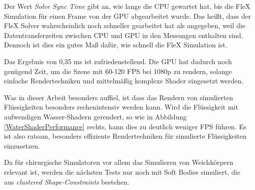 Der Wert \textit{Solve Sync Time} gibt an, wie lange die CPU gewartet hat, bis die FleX Simulation für einen Frame von der GPU abgearbeitet wurde. Das heißt, dass der FleX Solver wahrscheinlich noch schneller gearbeitet hat als angegeben, weil die Datentransferzeiten zwischen CPU und GPU in den Messungen enthalten sind. Dennoch ist dies ein gutes Maß dafür, wie schnell die FleX Simulation ist.

Das Ergebnis von 0,35 ms ist zufriedenstellend. Die GPU hat dadurch noch genügend Zeit, um die Szene mit 60-120 \ac{FPS} bei 1080p zu rendern, solange einfache Rendertechniken und mittelmäßig komplexe Shader eingesetzt werden. 

Was in dieser Arbeit besonders auffiel, ist dass das Rendern von simulierten Flüssigkeiten besonders rechenintensiv werden kann. Wird die Flüssigkeit mit aufwendigen Wasser-Shadern gerendert, so wie in Abbildung \ref{WaterShaderPerformance} rechts, kann dies zu deutlich weniger \ac{FPS} führen. Es ist also ratsam, besonders effiziente Rendertechniken für simulierte Flüssigkeiten einzusetzen.

Da für chirurgische Simulatoren vor allem das Simulieren von Weichkörpern relevant ist, werden die nächsten Tests nur noch mit Soft Bodies simuliert, die aus \textit{clustered Shape-Constraints} bestehen.

\clearpage
